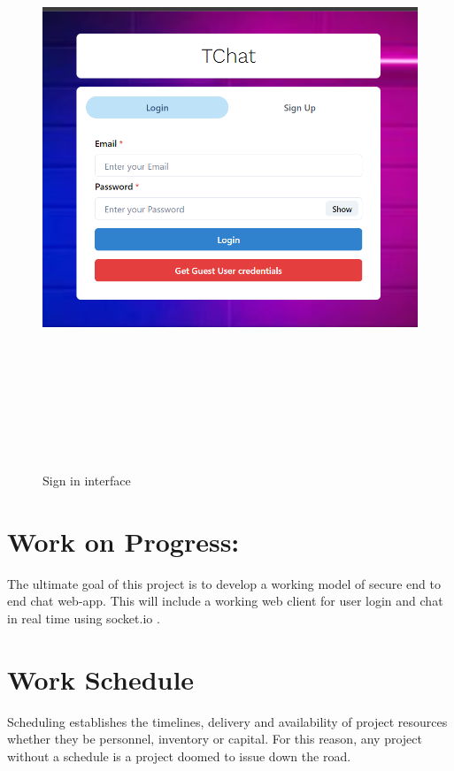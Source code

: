 \begin{figure}[H]
	\centering
	\includegraphics[width=160mm, height=180mm]{images/signin.png}
	\caption{Sign in interface} %
	\label{figusecase} %
\end{figure}


\section{Work on Progress:}
The ultimate goal of this project is to develop a working model of secure end to end chat web-app. This will include a working web client for user login and chat in real time using socket.io .

\section{Work Schedule}
Scheduling establishes the timelines, delivery and availability of project resources whether they be personnel, inventory or capital. For this reason, any project without a schedule is a project doomed to issue down the road.

